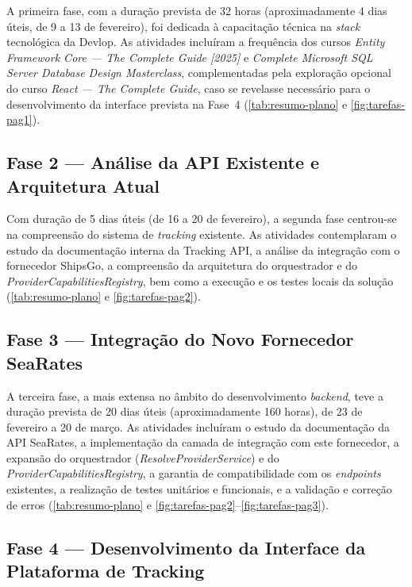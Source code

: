 \documentclass[a4paper,12pt]{report}
\begin{document}
A primeira fase, com a duração prevista de 32 horas (aproximadamente 4 dias úteis, de 9 a 13 de fevereiro), foi dedicada à capacitação técnica na \textit{stack} tecnológica da Devlop. As atividades incluíram a frequência dos cursos \textit{Entity Framework Core --- The Complete Guide [2025]} e \textit{Complete Microsoft SQL Server Database Design Masterclass}, complementadas pela exploração opcional do curso \textit{React --- The Complete Guide}, caso se revelasse necessário para o desenvolvimento da interface prevista na Fase~4 (\autoref{tab:resumo-plano} e \autoref{fig:tarefas-pag1}).

\subsection{Fase 2 --- Análise da API Existente e Arquitetura Atual}

Com duração de 5 dias úteis (de 16 a 20 de fevereiro), a segunda fase centrou-se na compreensão do sistema de \textit{tracking} existente. As atividades contemplaram o estudo da documentação interna da Tracking API, a análise da integração com o fornecedor ShipsGo, a compreensão da arquitetura do orquestrador e do \textit{ProviderCapabilitiesRegistry}, bem como a execução e os testes locais da solução (\autoref{tab:resumo-plano} e \autoref{fig:tarefas-pag2}).

\subsection{Fase 3 --- Integração do Novo Fornecedor SeaRates}

A terceira fase, a mais extensa no âmbito do desenvolvimento \textit{backend}, teve a duração prevista de 20 dias úteis (aproximadamente 160 horas), de 23 de fevereiro a 20 de março. As atividades incluíram o estudo da documentação da API SeaRates, a implementação da camada de integração com este fornecedor, a expansão do orquestrador (\textit{ResolveProviderService}) e do \textit{ProviderCapabilitiesRegistry}, a garantia de compatibilidade com os \textit{endpoints} existentes, a realização de testes unitários e funcionais, e a validação e correção de erros (\autoref{tab:resumo-plano} e \autoref{fig:tarefas-pag2}--\autoref{fig:tarefas-pag3}).

\subsection{Fase 4 --- Desenvolvimento da Interface da Plataforma de Tracking}
\end{document}
